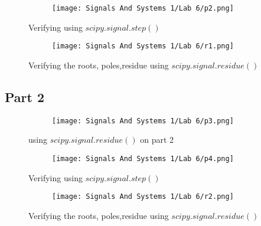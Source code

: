 \documentclass[12pt,a4paper]{article}
\begin{document}
\begin{figure}[h]
\centering
\begin{subfigure}{ 1\textwidth}
\texttt{[image: Signals And Systems 1/Lab 6/p2.png]}
\end{subfigure}
\caption{ Verifying using $scipy.signal.step()$ }
\label{fig2:image22}
\end{figure}

\begin{figure}[h]
\centering
\begin{subfigure}{ 1\textwidth}
\texttt{[image: Signals And Systems 1/Lab 6/r1.png]}
\end{subfigure}
\caption{ Verifying the roots, poles,residue using $scipy.signal.residue()$ }
\label{fig2:image22}
\end{figure}
\clearpage
\subsection{Part 2}



\begin{figure}[h]
\centering
\begin{subfigure}{ 1\textwidth}
\texttt{[image: Signals And Systems 1/Lab 6/p3.png]}
\end{subfigure}
\caption{ using $scipy.signal.residue()$ on part 2 }
\label{fig2:image22}
\end{figure}

\begin{figure}[h]
\centering
\begin{subfigure}{ 1\textwidth}
\texttt{[image: Signals And Systems 1/Lab 6/p4.png]}
\end{subfigure}
\caption{ Verifying using $scipy.signal.step()$ }
\label{fig2:image22}
\end{figure}

\clearpage

\begin{figure}[h]
\centering
\begin{subfigure}{ 1\textwidth}
\texttt{[image: Signals And Systems 1/Lab 6/r2.png]}
\end{subfigure}
\caption{ Verifying the roots, poles,residue using $scipy.signal.residue()$ }
\label{fig2:image22}
\end{figure}
\end{document}
